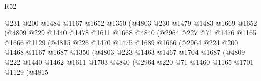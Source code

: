 \begin{lexlean}{R52}
\begin{coremodule}
                              @231
                              @200
                              @1484
                              @1167
                              @1652
                              @1350
                              (@4803
                                @230
                                @1479
                                @1483
                                @1669
                                @1652
                                (@4809
                                  @229
                                  @1440
                                  @1478
                                  @1611
                                  @1668
                                  @4840
                                  (@2964
                                    @227
                                    @71
                                    @1476
                                    @1165
                                    @1666
                                    @1129
                                    (@4815
                                      @226
                                      @1470
                                      @1475
                                      @1689
                                      @1666
                                      (@2964
                                        @224
                                        @200
                                        @1468
                                        @1167
                                        @1687
                                        @1350
                                        (@4803
                                          @223
                                          @1463
                                          @1467
                                          @1704
                                          @1687
                                          (@4809
                                            @222
                                            @1440
                                            @1462
                                            @1611
                                            @1703
                                            @4840
                                            (@2964
                                              @220
                                              @71
                                              @1460
                                              @1165
                                              @1701
                                              @1129
                                              (@4815

\end{coremodule}
\end{lexlean}
